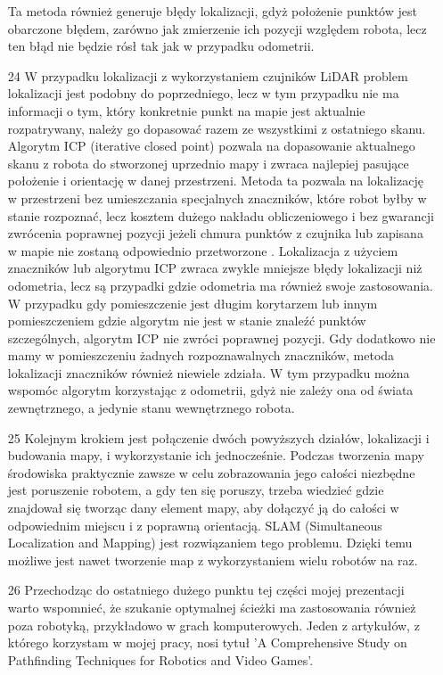\documentclass[20pt,a4paper]{article}
\begin{document}
\begin{itemize}
Ta metoda również generuje błędy lokalizacji, gdyż położenie punktów jest obarczone błędem, zarówno jak zmierzenie ich pozycji względem robota, lecz ten błąd nie będzie rósł tak jak w przypadku odometrii.
		\item[24]
	W przypadku lokalizacji z wykorzystaniem czujników LiDAR problem lokalizacji jest podobny do poprzedniego, lecz w tym przypadku nie ma informacji o tym, który konkretnie punkt na mapie jest aktualnie rozpatrywany, należy go dopasować razem ze wszystkimi z ostatniego skanu.
Algorytm ICP (iterative closed point) pozwala na dopasowanie aktualnego skanu z robota do stworzonej uprzednio mapy i zwraca najlepiej pasujące położenie i orientację w danej przestrzeni.
Metoda ta pozwala na lokalizację w przestrzeni bez umieszczania specjalnych znaczników, które robot byłby w stanie rozpoznać, lecz kosztem dużego nakładu obliczeniowego i bez gwarancji zwrócenia poprawnej pozycji jeżeli chmura punktów z czujnika lub zapisana w mapie nie zostaną odpowiednio przetworzone \cite{icp_article}.
Lokalizacja z użyciem znaczników lub algorytmu ICP zwraca zwykle mniejsze błędy lokalizacji niż odometria, lecz są przypadki gdzie odometria ma również swoje zastosowania. 
W przypadku gdy pomieszczenie jest długim korytarzem lub innym pomieszczeniem gdzie algorytm nie jest w stanie znaleźć punktów szczególnych, algorytm ICP nie zwróci poprawnej pozycji.
Gdy dodatkowo nie mamy w pomieszczeniu żadnych rozpoznawalnych znaczników, metoda lokalizacji znaczników również niewiele zdziała.
W tym przypadku można wspomóc algorytm korzystając z odometrii, gdyż nie zależy ona od świata zewnętrznego, a jedynie stanu wewnętrznego robota.
		\item[25]
		Kolejnym krokiem jest połączenie dwóch powyższych działów, lokalizacji i budowania mapy, i wykorzystanie ich jednocześnie. 
Podczas tworzenia mapy środowiska praktycznie zawsze w celu zobrazowania jego całości niezbędne jest poruszenie robotem, a gdy ten się poruszy, trzeba wiedzieć gdzie znajdował się tworząc dany element mapy, aby dołączyć ją do całości w odpowiednim miejscu i z poprawną orientacją.
SLAM (Simultaneous Localization and Mapping) jest rozwiązaniem tego problemu.
Dzięki temu możliwe jest nawet tworzenie map z wykorzystaniem wielu robotów na raz.
		\item[26]
		Przechodząc do ostatniego dużego punktu tej części mojej prezentacji warto wspomnieć, że szukanie optymalnej ścieżki ma zastosowania również poza robotyką, przykładowo w grach komputerowych. 
Jeden z artykułów, z którego korzystam w mojej pracy, nosi tytuł  'A Comprehensive Study on Pathfinding Techniques for Robotics and Video Games'.

\end{itemize}
\end{document}
